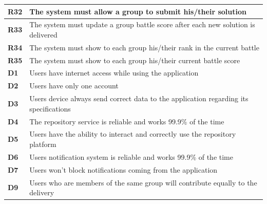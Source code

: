 \documentclass[../RASD.tex]{subfiles}
\begin{document}
\begin{table}[h!]
\begin{center}
\begin{tabular}{|m{2em}|m{30em}|}
                \hline
                \cellcolor{ReqMappingCell2}
                \textbf{R32} & The system must allow a group to submit his/their solution\\
                \hline
                \cellcolor{ReqMappingCell2}
                \textbf{R33} & The system must update a group battle score after each new solution is delivered\\
                \hline
                \cellcolor{ReqMappingCell2}
                \textbf{R34} & The system must show to each group his/their rank in the current battle\\
                \hline
                \cellcolor{ReqMappingCell2}
                \textbf{R35} & The system must show to each group his/their current battle score\\
                \hline
                \cellcolor{ReqMappingCell3}
                \textbf{D1} & Users have internet access while using the application\\
                \hline
                \cellcolor{ReqMappingCell3}
                \textbf{D2} & Users have only one account\\
                \hline
                \cellcolor{ReqMappingCell3}
                \textbf{D3} & Users device always send correct data to the application regarding its specifications\\
                \hline
                \cellcolor{ReqMappingCell3}
                \textbf{D4} & The repository service is reliable and works 99.9\% of the time\\
                \hline
                \cellcolor{ReqMappingCell3}
                \textbf{D5} & Users have the ability to interact and correctly use the repository platform\\
                \hline
                \cellcolor{ReqMappingCell3}
                \textbf{D6} & Users notification system is reliable and works 99.9\% of the time\\
                \hline
                \cellcolor{ReqMappingCell3}
                \textbf{D7} & Users won't block notifications coming from the application\\
                \hline
                \cellcolor{ReqMappingCell3}
                \textbf{D9} & Users who are members of the same group will contribute equally to the delivery\\
                \hline
                \end{tabular}
            \end{center}
        \end{table}\newpage
\end{document}
